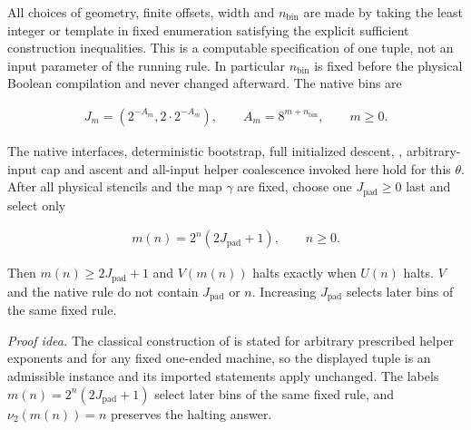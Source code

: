 \begin{lemma}
All choices of geometry, finite offsets, width and \(n_{\mathrm{bin}}\) are made by taking the least integer or template in fixed enumeration satisfying the explicit sufficient construction inequalities. This is a computable specification of one tuple, not an input parameter of the running rule. In particular \(n_{\mathrm{bin}}\) is fixed before the physical Boolean compilation and never changed afterward. The native bins are

\[
\begin{gathered}
J_{m} = (2^{-A_{m}}, 2\cdot 2^{-A_{m}}),\qquad A_{m}=8^{m+n_{\mathrm{bin}}},\qquad m\ge 0.
\end{gathered}
\]

The native interfaces, deterministic bootstrap, full initialized descent, \cite[Lemma~\ref*{cl:lem:past}]{DMNoise1D2026}, arbitrary-input cap and ascent and all-input helper coalescence invoked here hold for this \(\theta\). After all physical stencils and the map \(\gamma\) are fixed, choose one \(J_{\mathrm{pad}}\ge 0\) last and select only

\[
\begin{gathered}
m(n)=2^{n}(2 J_{\mathrm{pad}}+1),\qquad n\ge 0.
\end{gathered}
\]

Then \(m(n)\ge 2J_{\mathrm{pad}}+1\) and \(V(m(n))\) halts exactly when \(U(n)\) halts. \(V\) and the native rule do not contain \(J_{\mathrm{pad}}\) or \(n\). Increasing \(J_{\mathrm{pad}}\) selects later bins of the same fixed rule.

\end{lemma}
\par\noindent\emph{Proof idea.} The classical construction of \cite{DMNoise1D2026} is stated for arbitrary prescribed helper exponents and for any fixed one-ended machine, so the displayed tuple is an admissible instance and its imported statements apply unchanged. The labels \(m(n)=2^n(2J_{\mathrm{pad}}+1)\) select later bins of the same fixed rule, and \(\nu_2(m(n))=n\) preserves the halting answer.

